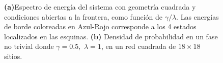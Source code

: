 \begin{figure}[h!]
\begin{subfigure}[b!]{0.56 \textwidth}
     \end{subfigure}\hspace*{1em} \vspace*{-0.5em}
        \caption{\textbf{(a)}Espectro de energía del sistema con geometría cuadrada y condiciones abiertas a la frontera, como función de $\gamma/\lambda$. Las energías de borde coloreadas en Azul-Rojo corresponde a los 4 estados localizados en las esquinas. \textbf{(b)} Densidad de probabilidad en un fase no trivial donde $\gamma = 0.5,\, \, \lambda = 1$, en un red cuadrada de $18\times18$ sitios.}
    \label{fig:Pram_Proy_cuadrado}
\end{figure}